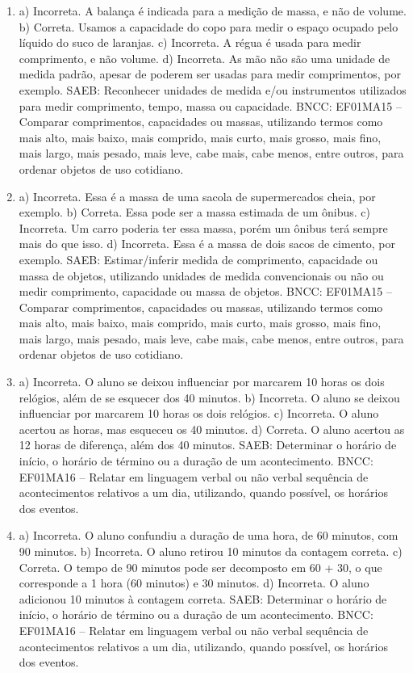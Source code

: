 \begin{enumerate}
\item
a) Incorreta. A balança é indicada para a medição de massa, e não de volume.
b) Correta. Usamos a capacidade do copo para medir o espaço ocupado pelo
líquido do suco de laranjas.
c) Incorreta. A régua é usada para medir comprimento, e não volume.
d) Incorreta. As mão não são uma unidade de medida padrão, apesar de poderem ser
usadas para medir comprimentos, por exemplo.
SAEB: Reconhecer unidades de medida e/ou instrumentos utilizados
para medir comprimento, tempo, massa ou capacidade.
BNCC: EF01MA15 -- Comparar comprimentos, capacidades ou massas,
utilizando termos como mais alto, mais baixo, mais comprido, mais curto,
mais grosso, mais fino, mais largo, mais pesado, mais leve, cabe mais,
cabe menos, entre outros, para ordenar objetos de uso cotidiano.

\item
a) Incorreta. Essa é a massa de uma sacola de supermercados
cheia, por exemplo.
b) Correta. Essa pode ser a massa estimada de um ônibus.
c) Incorreta. Um carro poderia ter essa massa, porém um ônibus terá sempre
mais do que isso.
d) Incorreta. Essa é a massa de dois sacos de cimento, por exemplo.
SAEB: Estimar/inferir medida de comprimento, capacidade ou massa
de objetos, utilizando unidades de medida convencionais ou não ou medir
comprimento, capacidade ou massa de objetos.
BNCC: EF01MA15 -- Comparar comprimentos, capacidades ou massas,
utilizando termos como mais alto, mais baixo, mais comprido, mais curto,
mais grosso, mais fino, mais largo, mais pesado, mais leve, cabe mais,
cabe menos, entre outros, para ordenar objetos de uso cotidiano.

\item
a) Incorreta. O aluno se deixou influenciar por marcarem 10 horas os
dois relógios, além de se esquecer dos 40 minutos.
b) Incorreta. O aluno se deixou influenciar por marcarem 10 horas os
dois relógios.
c) Incorreta. O aluno acertou as horas, mas esqueceu os 40 minutos.
d) Correta. O aluno acertou as 12 horas de diferença, além dos 40
minutos.
SAEB: Determinar o horário de início, o horário de término ou a
duração de um acontecimento.
BNCC: EF01MA16 -- Relatar em linguagem verbal ou não verbal sequência de
acontecimentos relativos a um dia, utilizando, quando possível, os
horários dos eventos.

\item
a) Incorreta. O aluno confundiu a duração de uma hora, de 60 minutos, com
90 minutos.
b) Incorreta. O aluno retirou 10 minutos da contagem correta.
c) Correta. O tempo de 90 minutos pode ser decomposto em 60 + 30, o que corresponde a 1 hora (60 minutos) e 30 minutos.
d) Incorreta. O aluno adicionou 10 minutos à contagem correta.
SAEB: Determinar o horário de início, o horário de término ou
a duração de um acontecimento.
BNCC: EF01MA16 -- Relatar em linguagem verbal ou não verbal sequência de
acontecimentos relativos a um dia, utilizando, quando possível, os
horários dos eventos.


\end{enumerate}
